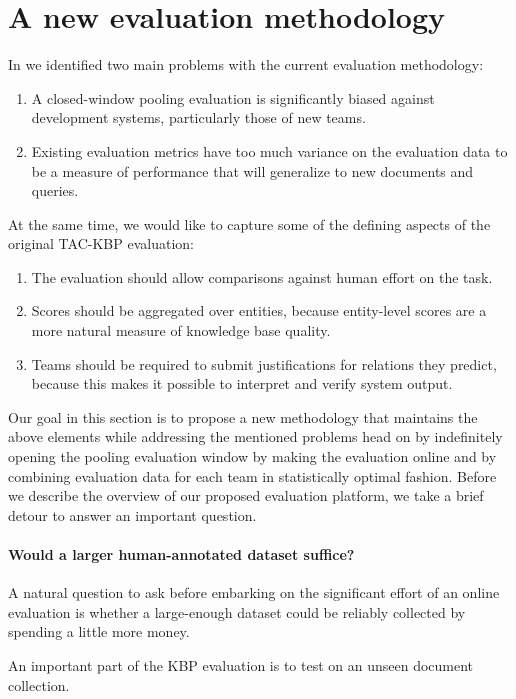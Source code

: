 \section{A new evaluation methodology}
\label{sec:methodology}

In  we identified two main problems with the current evaluation methodology:
\begin{enumerate}
  \item A closed-window pooling evaluation is significantly biased
    against development systems, particularly those of new teams.
  \item Existing evaluation metrics have too much variance on the
    evaluation data to be a measure of performance that will generalize
    to new documents and queries.
\end{enumerate}

At the same time, we would like to capture some of the defining aspects of the original TAC-KBP evaluation:
\begin{enumerate}
  \item The evaluation should allow comparisons against human effort on the task. %
  \item Scores should be aggregated over entities, because entity-level scores are a more natural measure of knowledge base quality.
  \item Teams should be required to submit justifications for relations they predict, because this makes it possible to interpret and verify system output.
\end{enumerate}

Our goal in this section is to propose a new methodology that maintains the above elements while addressing the mentioned problems head on 
  by indefinitely opening the pooling evaluation window by making the evaluation online
  and by combining evaluation data for each team in statistically optimal fashion.
Before we describe the overview of our proposed evaluation platform, we take a brief detour to answer an important question.

\paragraph{Would a larger human-annotated dataset suffice?}
A natural question to ask before embarking on the significant effort of an online evaluation is whether a large-enough dataset could be reliably collected by spending a little more money. 

An important part of the KBP evaluation is to test on an unseen document collection.

